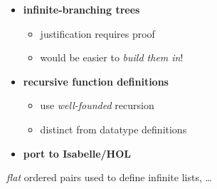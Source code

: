 \begin{slide}
\centering
\begin{itemize}
  \item {\bf infinite-branching trees}
    \begin{itemize}
      \item justification requires proof
      \item would be easier to {\it build them in\/}!
    \end{itemize}
  \item {\bf recursive function definitions}
    \begin{itemize}
      \item use {\it well-founded\/} recursion
      \item distinct from datatype definitions
    \end{itemize}
  \item {\bf port to Isabelle/HOL}
\end{itemize}
\end{slide}




{\it flat\/} ordered pairs used to define infinite lists, \ldots

\begin{slide}
\heading{}\centering
\end{slide}

